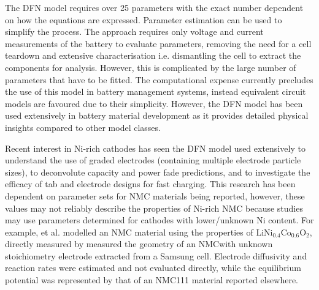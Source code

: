 \documentclass[journal=jacsat,manuscript=article]{achemso}
\begin{document}
The DFN model requires over 25 parameters with the exact number dependent on how the equations are expressed.\cite{Kim2011} 
Parameter estimation can be used to simplify the process. The approach requires only voltage and current measurements of the battery to evaluate parameters, removing the need for a cell teardown and extensive characterisation i.e. dismantling the cell to extract the components for analysis. \cite{Jin2018} However, this is complicated by the large number of parameters that have to be fitted.
The computational expense currently precludes the use of this model in battery management systems, instead equivalent circuit models are favoured due to their simplicity.\cite{Marquis2019} However, the DFN model has been used extensively in battery material development as it provides detailed physical insights compared to other model classes.\cite{Dawson2018}

Recent interest in Ni-rich cathodes has seen the DFN model used extensively to understand the use of graded electrodes (containing multiple electrode particle sizes), to deconvolute capacity and power fade predictions, and to investigate the efficacy of tab and electrode designs for fast charging.\cite{Richardson2020,Kindermann2017,Sturm2019} 
This research has been dependent on parameter sets for NMC materials being reported, however, these values may not reliably describe the properties of Ni-rich NMC because studies may use parameters determined for cathodes with lower/unknown Ni content. 
For example, \citeauthor{Richardson2020} et al. modelled an NMC material using the properties of LiNi$_{0.4}$Co$_{0.6}$O$_2$, directly measured by \citeauthor{Ecker2015}\cite{Richardson2020,Ecker2015} \citeauthor{Kindermann2017} measured the geometry of an NMC\textendash with unknown stoichiometry  \textendash electrode extracted from a Samsung cell.\cite{Kindermann2017} 
Electrode diffusivity and reaction rates were estimated and not evaluated directly, while the equilibrium potential was represented by that of an NMC111 material reported elsewhere.\cite{Stewart_2008} 
\end{document}
